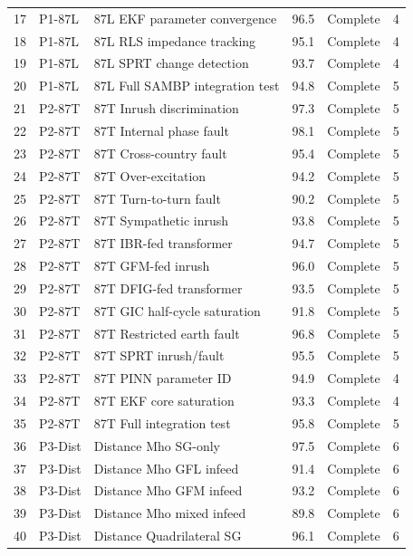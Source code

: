 \documentclass[11pt,a4paper]{report}
\newcommand{\cmark}{\ding{51}}
\begin{document}
\begin{longtable}{@{}p{0.7cm}p{1.2cm}p{4.5cm}p{1.3cm}p{1.5cm}p{1.0cm}@{}}
17 & P1-87L & 87L EKF parameter convergence & 96.5 & \cmark Complete & 4 \\
18 & P1-87L & 87L RLS impedance tracking & 95.1 & \cmark Complete & 4 \\
19 & P1-87L & 87L SPRT change detection & 93.7 & \cmark Complete & 4 \\
20 & P1-87L & 87L Full SAMBP integration test & 94.8 & \cmark Complete & 5 \\
21 & P2-87T & 87T Inrush discrimination & 97.3 & \cmark Complete & 5 \\
22 & P2-87T & 87T Internal phase fault & 98.1 & \cmark Complete & 5 \\
23 & P2-87T & 87T Cross-country fault & 95.4 & \cmark Complete & 5 \\
24 & P2-87T & 87T Over-excitation & 94.2 & \cmark Complete & 5 \\
25 & P2-87T & 87T Turn-to-turn fault & 90.2 & \cmark Complete & 5 \\
26 & P2-87T & 87T Sympathetic inrush & 93.8 & \cmark Complete & 5 \\
27 & P2-87T & 87T IBR-fed transformer & 94.7 & \cmark Complete & 5 \\
28 & P2-87T & 87T GFM-fed inrush & 96.0 & \cmark Complete & 5 \\
29 & P2-87T & 87T DFIG-fed transformer & 93.5 & \cmark Complete & 5 \\
30 & P2-87T & 87T GIC half-cycle saturation & 91.8 & \cmark Complete & 5 \\
31 & P2-87T & 87T Restricted earth fault & 96.8 & \cmark Complete & 5 \\
32 & P2-87T & 87T SPRT inrush/fault & 95.5 & \cmark Complete & 5 \\
33 & P2-87T & 87T PINN parameter ID & 94.9 & \cmark Complete & 4 \\
34 & P2-87T & 87T EKF core saturation & 93.3 & \cmark Complete & 4 \\
35 & P2-87T & 87T Full integration test & 95.8 & \cmark Complete & 5 \\
36 & P3-Dist & Distance Mho SG-only & 97.5 & \cmark Complete & 6 \\
37 & P3-Dist & Distance Mho GFL infeed & 91.4 & \cmark Complete & 6 \\
38 & P3-Dist & Distance Mho GFM infeed & 93.2 & \cmark Complete & 6 \\
39 & P3-Dist & Distance Mho mixed infeed & 89.8 & \cmark Complete & 6 \\
40 & P3-Dist & Distance Quadrilateral SG & 96.1 & \cmark Complete & 6 \\

\end{longtable}
\end{document}
